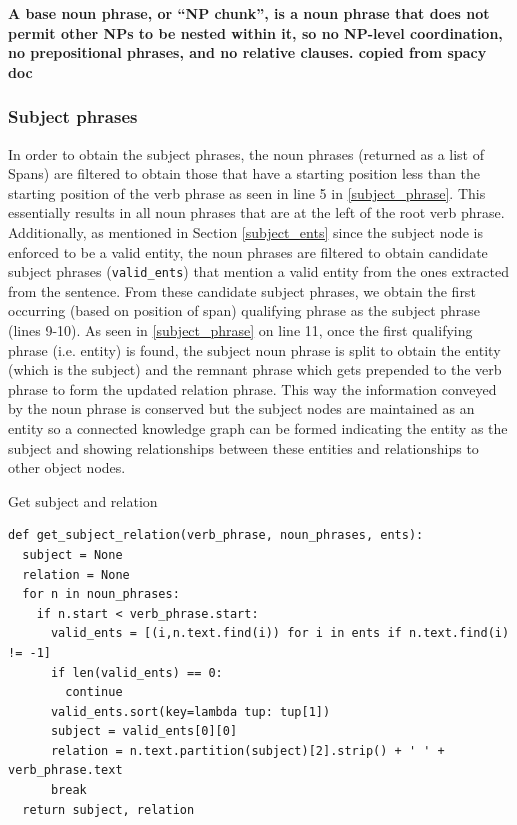 \textbf{A base noun phrase, or “NP chunk”, is a noun phrase that does not permit other NPs to be nested within it, so no NP-level coordination, no prepositional phrases, and no relative clauses. copied from spacy doc}

\subsubsection{Subject phrases}

In order to obtain the subject phrases, the noun phrases (returned as a list of Spans) are filtered to obtain those that have a starting position less than the starting position of the verb phrase as seen in line 5 in \ref{subject_phrase}. This essentially results in all noun phrases that are at the left of the root verb phrase. Additionally, as mentioned in Section \ref{subject_ents} since the subject node is enforced to be a valid entity, the noun phrases are filtered to obtain candidate subject phrases (\texttt{valid\_ents}) that mention a valid entity from the ones extracted from the sentence. From these candidate subject phrases, we obtain the first occurring (based on position of span) qualifying phrase as the subject phrase (lines 9-10). As seen in \ref{subject_phrase} on line 11, once the first qualifying phrase (i.e. entity) is found, the subject noun phrase is split to obtain the entity (which is the subject)  and the remnant phrase which gets prepended to the verb phrase to form the updated relation phrase. This way the information conveyed by the noun phrase is conserved but the subject nodes are maintained as an entity so a connected knowledge graph can be formed indicating the entity as the subject and showing relationships between these entities and relationships to other object nodes. 

\begin{listing}[H]
\caption{Get subject and relation}
\label{subject_phrase}
\begin{verbatim}
def get_subject_relation(verb_phrase, noun_phrases, ents):
  subject = None
  relation = None
  for n in noun_phrases:
    if n.start < verb_phrase.start:
      valid_ents = [(i,n.text.find(i)) for i in ents if n.text.find(i) != -1]
      if len(valid_ents) == 0:
        continue
      valid_ents.sort(key=lambda tup: tup[1])
      subject = valid_ents[0][0]
      relation = n.text.partition(subject)[2].strip() + ' ' + verb_phrase.text
      break
  return subject, relation
\end{verbatim}
\end{listing}

